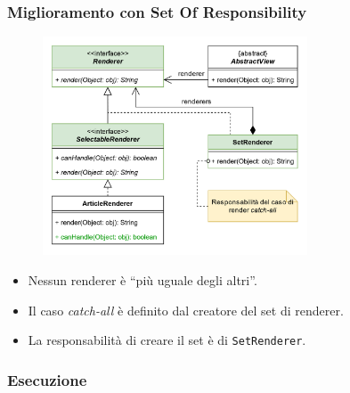 \begin{frame}
    \frametitle{Miglioramento con Set Of Responsibility}

    \begin{figure}
        \includegraphics[width=0.7\textwidth]{img/setofresponsibility.png}
    \end{figure}
    \begin{itemize}
      \item Nessun renderer è ``più uguale degli altri''.
      \item Il caso \emph{catch-all} è definito dal creatore del set di renderer.
      \item La responsabilità di creare il set è di \texttt{SetRenderer}.
    \end{itemize}
\end{frame}

\begin{frame}
    \frametitle{Esecuzione}
\end{frame}

